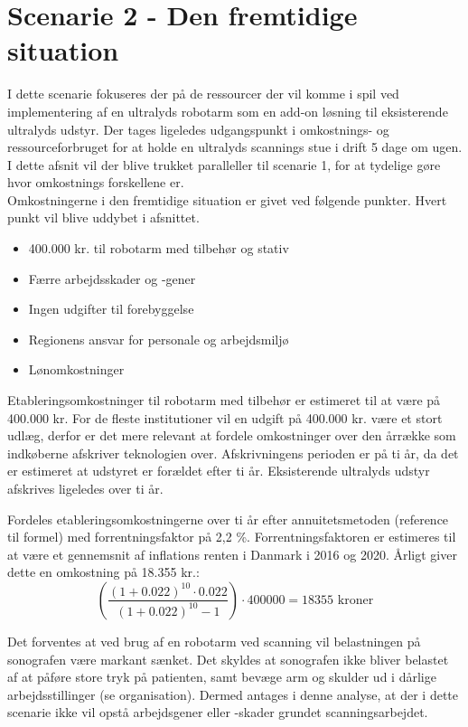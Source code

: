 \section{Scenarie 2 - Den fremtidige situation}
I dette scenarie fokuseres der på de ressourcer der vil komme i spil ved implementering af en ultralyds robotarm som en add-on løsning til eksisterende ultralyds udstyr. Der tages ligeledes udgangspunkt i omkostnings- og ressourceforbruget for at holde en ultralyds scannings stue i drift 5 dage om ugen. I dette afsnit vil der blive trukket paralleller til scenarie 1, for at tydelige gøre hvor omkostnings forskellene er. \\
Omkostningerne i den fremtidige situation er givet ved følgende punkter. Hvert punkt vil blive uddybet i afsnittet.
\begin{itemize}
\item 400.000 kr. til robotarm med tilbehør og stativ
\item Færre arbejdsskader og -gener
\item Ingen udgifter til forebyggelse
\item Regionens ansvar for personale og arbejdsmiljø
\item Lønomkostninger
\end{itemize}
Etableringsomkostninger til robotarm med tilbehør er estimeret til at være på 400.000 kr. For de fleste institutioner vil en udgift på 400.000 kr. være et stort udlæg, derfor er det mere relevant at fordele omkostninger over den årrække som indkøberne afskriver teknologien over. Afskrivningens perioden er på ti år, da det er estimeret at udstyret er forældet efter ti år. Eksisterende ultralyds udstyr afskrives ligeledes over ti år. 

Fordeles etableringsomkostningerne over ti år efter annuitetsmetoden (reference til formel) med forrentningsfaktor på 2,2 \%. Forrentningsfaktoren er estimeres til at være et gennemsnit af inflations renten i Danmark i 2016 og 2020. Årligt giver dette en omkostning på 18.355 kr.:
\begin{equation}
\left(\frac{(1+0.022)^{10}\cdot0.022}{(1+0.022)^{10}-1}\right)\cdot400000=18355 \text{ kroner}
\end{equation}

Det forventes at ved brug af en robotarm ved scanning vil belastningen på sonografen være markant sænket. Det skyldes at sonografen ikke bliver belastet af at påføre store tryk på patienten, samt bevæge arm og skulder ud i dårlige arbejdsstillinger (se organisation). Dermed antages i denne analyse, at der i dette scenarie ikke vil opstå arbejdsgener eller -skader grundet scanningsarbejdet. 

